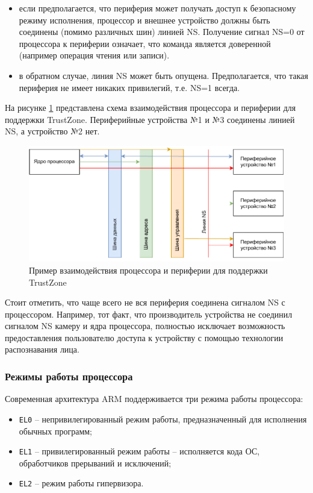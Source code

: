 \begin{itemize}
	\item если предполагается, что периферия может получать доступ к безопасному режиму исполнения, процессор и внешнее устройство должны быть соединены (помимо различных шин) линией NS. Получение сигнал NS=0 от процессора к периферии означает, что команда является доверенной (например операция чтения или записи).
	\item в обратном случае, линия NS может быть опущена. Предполагается, что такая периферия не имеет никаких привилегий, т.е. NS=1 всегда.
\end{itemize}

На рисунке \ref{fig:ns-bit} представлена схема взаимодействия процессора и периферии для поддержки TrustZone. Периферийные устройства №1 и №3 соединены линией NS, а устройство №2 нет.

\begin{figure}[h]
	\centering
	\includegraphics[width=\textwidth]{img/arm-ns.pdf}
	\caption{Пример взаимодействия процессора и периферии для поддержки TrustZone}
	\label{fig:ns-bit}
\end{figure}

Стоит отметить, что чаще всего не вся периферия соединена сигналом NS с процессором. Например, тот факт, что производитель устройства не соединил сигналом NS камеру и ядра процессора, полностью исключает возможность предоставления пользователю доступа к устройству с помощью технологии распознавания лица.

\subsubsection{Режимы работы процессора}

Современная архитектура ARM поддерживается три режима работы процессора: 

\begin{itemize}
	\item \texttt{EL0} -- непривилегированный режим работы, предназначенный для исполнения обычных программ;
	\item \texttt{EL1} -- привилегированный режим работы -- исполняется кода ОС, обработчиков прерываний и исключений;
	\item \texttt{EL2} -- режим работы гипервизора.
\end{itemize}

